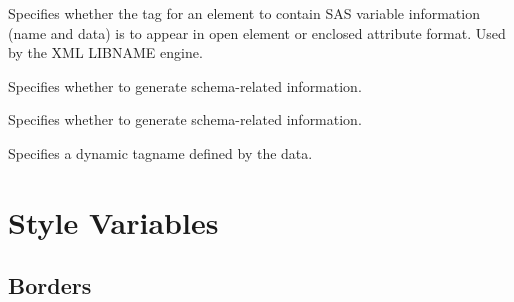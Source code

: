 \begin{description}


Specifies whether the tag for an element to contain SAS variable information (name and data) is to appear in open element or enclosed attribute format. Used by the XML LIBNAME engine.

Specifies whether to generate schema-related information.

Specifies whether to generate schema-related information.

Specifies a dynamic tagname defined by the data.


\end{description}

\section{Style Variables}
\subsection{Borders}

